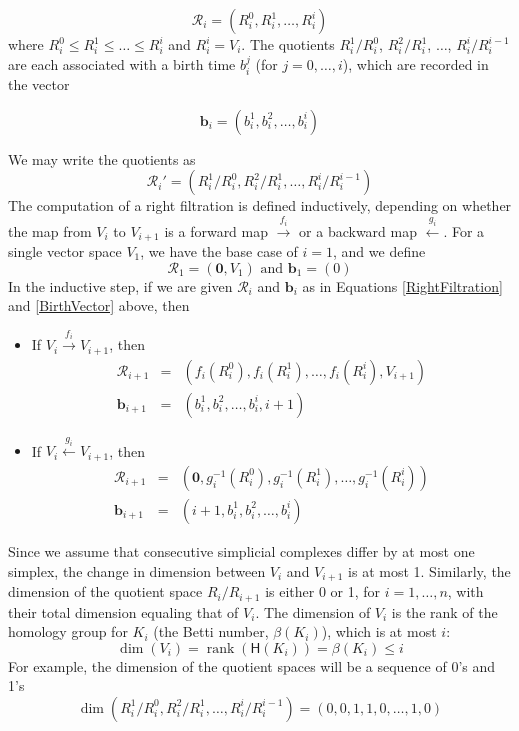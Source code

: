 \documentclass[12pt]{article}
\DeclareMathOperator{\rank}{rank}
\begin{document}
\begin{equation}\label{RightFiltration}
\mathcal{R}_i = (R_i^0, R_i^1, \ldots, R_i^i)
\end{equation}
where $R_i^0 \leq R_i^1 \leq \ldots \leq R_i^i$ and $R_i^i = V_i$. The quotients $R_i^1/R_i^0$, $R_i^2/R_i^1$, $\ldots$, $R_i^i/R_i^{i-1}$ are each associated with a birth time $b_i^j$ (for $j=0, \ldots, i$), which are recorded in the vector

\begin{equation}\label{BirthVector}
\mathbf{b}_i = (b_i^1, b_i^2, \ldots, b_i^i)
\end{equation}

We may write the quotients as
\[ \mathcal{R}_i' = (R_i^1/R_i^0, R_i^2/R_i^1, \ldots, R_i^i/R_i^{i-1}) \]
The computation of a right filtration is defined inductively, depending on whether the map from $V_i$ to $V_{i+1}$ is a forward map $\overset{f_i}{\longrightarrow}$ or a backward map $\overset{g_i}{\longleftarrow}$. For a single vector space $V_1$, we have the base case of $i=1$, and we define
\[ \mathcal{R}_1 = (\textbf{0}, V_1) \mbox{ and  } \mathbf{b}_1 = (0) \]
In the inductive step, if we are given $\mathcal{R}_i$ and $\mathbf{b}_i$ as in Equations \ref{RightFiltration} and \ref{BirthVector} above, then
\begin{itemize}
\item If $V_i \overset{f_i}{\longrightarrow} V_{i+1}$, then
\begin{eqnarray}\label{fRight}
\mathcal{R}_{i+1} & = & (f_i(R_i^0), f_i(R_i^1), \ldots, f_i(R_i^i), V_{i+1}) \\
\mathbf{b}_{i+1} & = & (b_i^1, b_i^2, \ldots, b_i^i, i+1) \nonumber
\end{eqnarray}
\item If $V_i \overset{g_i}{\longleftarrow} V_{i+1}$, then
\begin{eqnarray}\label{gRight}
\mathcal{R}_{i+1} & = & (\textbf{0}, g_i^{-1}(R_i^0), g_i^{-1}(R_i^1), \ldots, g_i^{-1}(R_i^i)) \\
\mathbf{b}_{i+1} & = & (i+1, b_i^1, b_i^2, \ldots, b_i^i) \nonumber
\end{eqnarray}
\end{itemize}

Since we assume that consecutive simplicial complexes differ by at most one simplex, the change in dimension between $V_i$ and $V_{i+1}$ is at most 1. Similarly, the dimension of the quotient space $R_i/R_{i+1}$ is either 0 or 1, for $i = 1,\ldots, n$, with their total dimension equaling that of $V_i$. The dimension of $V_i$ is the rank of the homology group for $K_i$ (the Betti number, $\beta(K_i)$), which is at most $i$:
\[ \dim(V_i) = \rank(\mathsf{H}(K_i)) = \beta(K_i) \leq i \]
For example, the dimension of the quotient spaces will be a sequence of 0's and 1's
\[ \dim(R_i^1/R_i^0, R_i^2/R_i^1, \ldots, R_i^i/R_i^{i-1}) = (0, 0, 1, 1, 0, \ldots, 1, 0) \]
\end{document}
